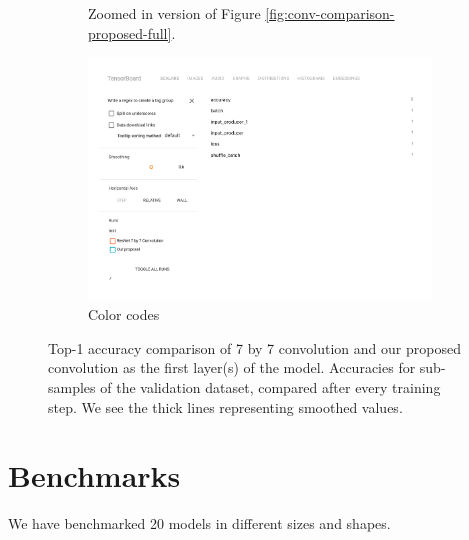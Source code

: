 \begin{figure}[h]
\begin{subfigure}{.79\textwidth}
        \caption{Zoomed in version of Figure \ref{fig:conv-comparison-proposed-full}.}
  \end{subfigure}
  \begin{subfigure}{.49\textwidth}
        \includegraphics[width=1\linewidth]{images/proposed_conv_legend.pdf}
        \caption{Color codes}
  \end{subfigure}
  \caption{Top-1 accuracy comparison of 7 by 7 convolution and our proposed convolution as the first layer(s) of the model. Accuracies for sub-samples of the validation dataset, compared after every training step. We see the thick lines representing smoothed values.}
  \label{fig:proposed-comparison}
\end{figure}

\section{Benchmarks}
We have benchmarked 20 models in different sizes and shapes. 




